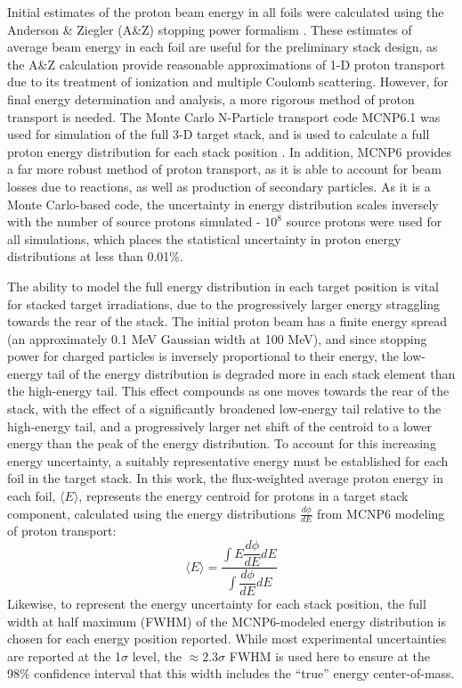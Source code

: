 \documentclass[3p]{elsarticle}
\begin{document}
Initial estimates of the proton beam energy in all foils were calculated using the Anderson \& Ziegler (A\&Z) stopping power formalism \cite{Andersen_Ziegler_1977,Ziegler1985,Ziegler1999}.
These estimates of average beam energy in each foil are useful for the preliminary stack design, as the A\&Z calculation provide reasonable approximations of 1-D proton transport due to its treatment of ionization and multiple Coulomb scattering. 
However, for final energy determination and analysis, a more rigorous method of proton transport is needed.
The Monte Carlo N-Particle transport code MCNP6.1 was used for simulation of the full 3-D target stack, and is used to calculate a full proton energy distribution for each stack position   \cite{Goorley2012}.
In addition, MCNP6 provides a far more robust method of proton transport, as it is able to account for beam losses due to reactions, as well as production of secondary particles.
As it is a Monte Carlo-based code, the uncertainty in energy distribution scales inversely with the number of source protons simulated - $10^8$ source protons were used for all simulations, which places the statistical uncertainty in proton energy distributions at less than 0.01\%.


The ability to model the full energy distribution in each target position is vital for stacked target irradiations, due to the progressively larger energy straggling towards the rear of the stack.
The initial proton beam has a finite energy spread (an approximately 0.1 MeV Gaussian width at 100 MeV), and since stopping power for charged particles is inversely proportional to their energy, the low-energy tail of the energy distribution is degraded more in each stack element than the high-energy tail.
This effect compounds as one moves towards the rear of the stack, with the effect of a significantly broadened low-energy tail relative to the high-energy tail, and a progressively larger net shift of the centroid to a lower energy than the peak of the energy distribution. 
To account for this increasing energy uncertainty, a suitably representative energy must be established for  each foil in the target stack.
In this work, the flux-weighted average proton  energy in each foil, $\langle E \rangle$,  represents the energy centroid for protons in a target stack component, calculated using the energy distributions $\frac{d\phi}{dE}$ from MCNP6 modeling of proton transport:
\begin{equation}
\langle E \rangle = \dfrac{{\displaystyle\int E \dfrac{d\phi}{dE} dE}}{{\displaystyle\int \dfrac{d\phi}{dE} dE}}
\end{equation}
Likewise, to represent the energy uncertainty for each stack position, the full width at half maximum (FWHM) of the MCNP6-modeled energy distribution is chosen for each energy position reported.
While most experimental uncertainties are reported at the 1$\sigma$ level, the $\approx2.3\sigma$ FWHM is used here to ensure at the 98\% confidence interval that this width includes  the \enquote{true} energy center-of-mass.
\end{document}
